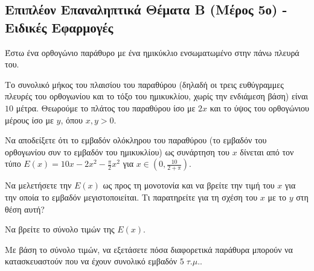 \documentclass[a4paper,11pt,twoside]{article}
\def\xrwma{red!80!black}
\newcommand{\kerkissans}[1]{{\fontfamily{maksf}\selectfont {#1}}}
\newcommand{\myleftmark}{\leftmark}
\renewcommand{\myleftmark}{{\large Τυπολόγιο}}
\newcommand\thema{A}
\newcounter{askhsh}[section]
\renewcommand{\theaskhsh}{\arabic{askhsh}}
\newcommand{\Askhsh}{\refstepcounter{askhsh}{\textbf{\textcolor{black}{\faPenSquare\ \  \large \kerkissans{\textbf{\theaskhshο\hspace{2mm}Θέμα}}}}}\hspace{0mm}}{}
\newenvironment{askhsh}[1]
{\begin{tcolorbox}[title=\Askhsh\kerkissans{\textbf{\large{  #1}}},breakable,
enhanced standard,titlerule=-.2pt,toprule=0pt, rightrule=0pt, bottomrule=0pt,
colback=white,left=2mm,top=1mm,bottom=0mm,
boxrule=0pt,
colframe=white,borderline west={1.5mm}{0pt}{\xrwma},leftrule=2mm,sharp corners,coltitle=black]
\renewcommand{\thema}{#1}}
{\end{tcolorbox}}
\begin{document}
\pagestyle{fancy}

\renewcommand{\myleftmark}{\large Τυπολόγιο}
\begin{center}
\part{Επιπλέον Επαναληπτικά Θέματα Β (Μέρος 5ο) - Ειδικές Εφαρμογές}
\end{center}

\begin{askhsh}{B}
Έστω ένα ορθογώνιο παράθυρο με ένα ημικύκλιο ενσωματωμένο στην πάνω πλευρά του.
\begin{center}
\end{center}
Το συνολικό μήκος του πλαισίου του παραθύρου (δηλαδή οι τρεις ευθύγραμμες πλευρές του ορθογωνίου και το τόξο του ημικυκλίου, χωρίς την ενδιάμεση βάση) είναι $10$ μέτρα. Θεωρούμε το πλάτος του παραθύρου ίσο με $2x$ και το ύψος του ορθογώνιου μέρους ίσο με $y$, όπου $x, y > 0$.
\begin{erwthma}
  \item Να αποδείξετε ότι το εμβαδόν ολόκληρου του παραθύρου (το εμβαδόν του ορθογωνίου συν το εμβαδόν του ημικυκλίου) ως συνάρτηση του $x$ δίνεται από τον τύπο $E(x) = 10x - 2x^2 - \frac{\pi}{2}x^2$ για $x \in \left(0, \frac{10}{2+\pi}\right)$.
  \item Να μελετήσετε την $E(x)$ ως προς τη μονοτονία και να βρείτε την τιμή του $x$ για την οποία το εμβαδόν μεγιστοποιείται. Τι παρατηρείτε για τη σχέση του $x$ με το $y$ στη θέση αυτή?
  \item Να βρείτε το σύνολο τιμών της $E(x)$.
  \item Με βάση το σύνολο τιμών, να εξετάσετε πόσα διαφορετικά παράθυρα μπορούν να κατασκευαστούν που να έχουν συνολικό εμβαδόν $5 \; \tau.\mu.$.
\end{erwthma}
\end{askhsh}
\end{document}
